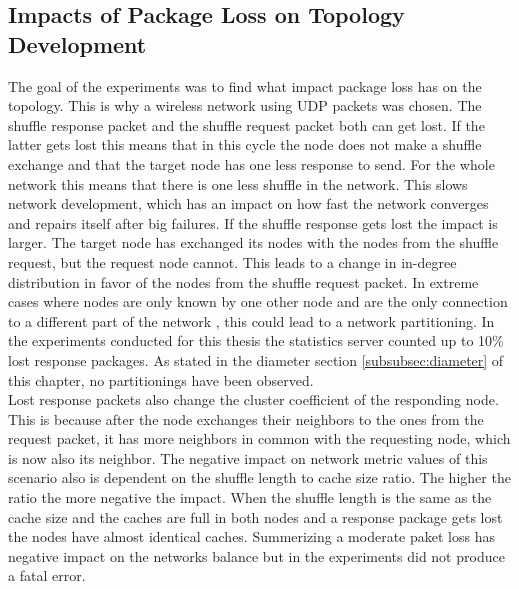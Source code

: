 \subsection{Impacts of Package Loss on Topology Development}
	The goal of the experiments was to find what impact package loss has on the
	topology. This is why a wireless network using UDP packets was chosen. The
	shuffle response packet and the shuffle request packet both can get lost. If
	the latter gets lost this means that in this cycle the node does not make
	a shuffle exchange and that the target node has one less response to send.
	For the whole network this means that there is one less shuffle in the
	network. This slows network development, which has an impact on how fast the
	network converges and repairs itself after big failures.
	If the shuffle response gets lost the impact is larger. The target node has
	exchanged its nodes with the nodes from the shuffle request, but the request
	node cannot. This leads to a change in in-degree distribution in favor of the
	nodes from the shuffle request packet. In extreme cases where nodes are only
	known by one other node and are the only connection to a different part of
	the network , this could lead to a network partitioning. In the experiments
	conducted for this thesis the statistics server counted up to 10\% lost
	response packages. As stated in the diameter section \ref{subsubsec:diameter}
	of this chapter, no partitionings have been observed.\\
	Lost response packets also change the cluster coefficient of the responding
	node. This is because after the node exchanges their neighbors to the ones from
	the request packet, it has more neighbors in common with the requesting node,
	which is now also its neighbor. The negative impact on network metric values of
	this scenario also is dependent on the shuffle length to cache size ratio. The
	higher the ratio the more negative the impact. When the shuffle length is the
	same as the cache size and the caches are full in both nodes and a response
	package gets lost the nodes have almost identical caches. Summerizing a
	moderate paket loss has negative impact on the networks balance but in the
	experiments did not produce a fatal error.
